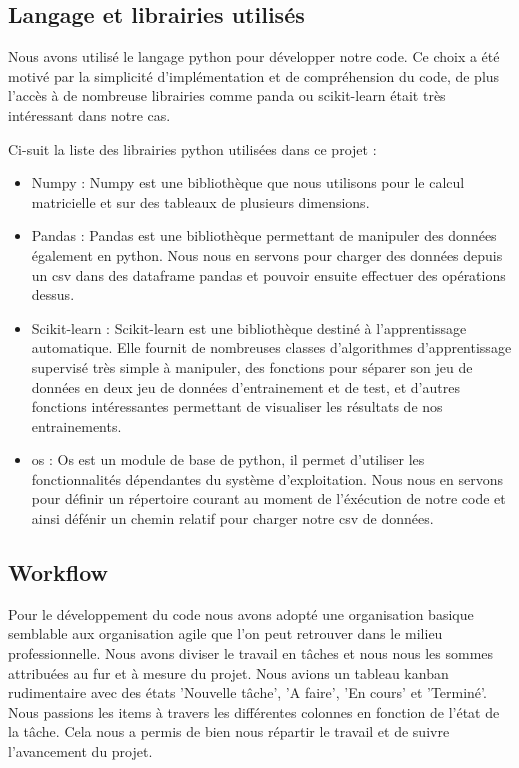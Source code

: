 \documentclass{article}
\begin{document}
\subsection{Langage et librairies utilisés}
Nous avons utilisé le langage python pour développer notre code. Ce choix a été motivé par la simplicité d'implémentation et de compréhension du code, de plus l'accès à de nombreuse librairies comme panda ou scikit-learn était très intéressant dans notre cas. 

Ci-suit la liste des librairies python utilisées dans ce projet : 
\begin{itemize}
  \item Numpy : Numpy est une bibliothèque que nous utilisons pour le calcul matricielle et sur des tableaux de plusieurs dimensions.
  \item Pandas : Pandas est une bibliothèque permettant de manipuler des données également en python. Nous nous en servons pour charger des données depuis un csv dans des dataframe pandas et pouvoir ensuite effectuer des opérations dessus.
  \item Scikit-learn : Scikit-learn est une bibliothèque destiné à l'apprentissage automatique. Elle fournit de nombreuses classes d'algorithmes d'apprentissage supervisé très simple à manipuler, des fonctions pour séparer son jeu de données en deux jeu de données d'entrainement et de test, et d'autres fonctions intéressantes permettant de visualiser les résultats de nos entrainements.
  \item os : Os est un module de base de python, il permet d'utiliser les fonctionnalités dépendantes du système d'exploitation. Nous nous en servons pour définir un répertoire courant au moment de l'éxécution de notre code et ainsi défénir un chemin relatif pour charger notre csv de données.
\end{itemize}

\subsection{Workflow}

Pour le développement du code nous avons adopté une organisation basique semblable aux organisation agile que l'on peut retrouver dans le milieu professionnelle. 
Nous avons diviser le travail en tâches et nous nous les sommes attribuées au fur et à mesure du projet. Nous avions un tableau kanban rudimentaire avec des états 'Nouvelle tâche', 'A faire', 'En cours' et 'Terminé'. Nous passions les items à travers les différentes colonnes en fonction de l'état de la tâche. Cela nous a permis de bien nous répartir le travail et de suivre l'avancement du projet. 
\end{document}
